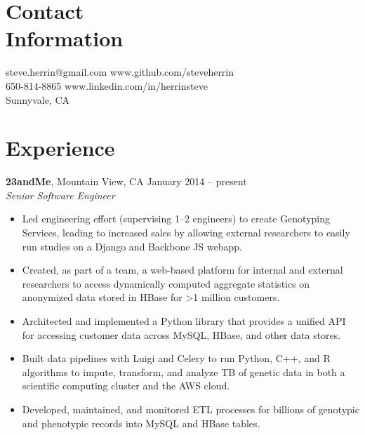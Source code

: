 \documentclass[margin,line]{resume}
\begin{document}
\begin{resume}

    \section{\mysidestyle Contact\\Information}

    steve.herrin@gmail.com		\hfill www.github.com/steveherrin		\vspace{0mm}\\\vspace{0mm}%
    650-814-8865				\hfill www.linkedin.com/in/herrinsteve	\vspace{0mm}\\\vspace{-4.5mm}%
    Sunnyvale, CA    			\hfill				    				\vspace{0mm}\\\vspace{0mm}%
    
    \section{\mysidestyle Experience}

    \textbf{23andMe}, Mountain View, CA \hfill January 2014 -- present\vspace{1mm}\\\vspace{1mm}%
    \textsl{Senior Software Engineer}
    \begin{itemize}
    \item Led engineering effort (supervising 1--2 engineers) to create Genotyping Services, leading to increased sales by allowing external researchers to easily run studies on a Django and Backbone JS webapp.
    \item Created, as part of a team, a web-based platform for internal and external researchers to access dynamically computed aggregate statistics on anonymized data stored in HBase for \textgreater 1 million customers.
    \item Architected and implemented a Python library that provides a unified API for accessing customer data across MySQL, HBase, and other data stores.
    \item Built data pipelines with Luigi and Celery to run Python, C++, and R algorithms to impute, transform, and analyze TB of genetic data in both a scientific computing cluster and the AWS cloud.
    \item Developed, maintained, and monitored ETL processes for billions of genotypic and phenotypic records into MySQL and HBase tables.
    \end{itemize}
    

\end{resume}
\end{document}
